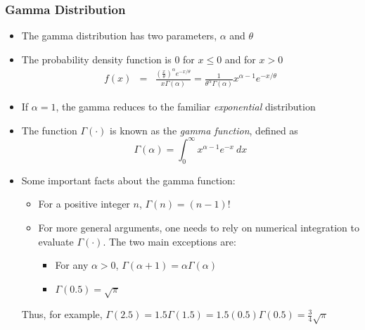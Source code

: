 \documentclass{beamer}
\begin{document}
\begin{frame}%
\frametitle{Gamma Distribution}

\begin{itemize}
\item The gamma distribution has two parameters,  $\alpha$ and $\theta$ %

\item The probability density function is 0 for $x \le 0$ and for $x>0$
\begin{eqnarray*}
f(x) &=& \frac{(\frac{x}{\theta})^{\alpha} e^{-x/\theta}}{x\Gamma(\alpha)} = \frac{1}{\theta^{\alpha} \Gamma(\alpha)} x^{\alpha - 1} e^{-x/\theta}
\end{eqnarray*} %

\item If $\alpha=1$, the gamma reduces to the familiar \textit{exponential} distribution
\item The function $\Gamma(\cdot)$ is known as the \textit{gamma function}, defined as
\begin{equation*}
\Gamma(\alpha) =  \int_0^{\infty} x^{\alpha-1} e^{-x} ~dx
\end{equation*} %
\item Some important facts about the gamma function: %

\begin{itemize}
\item For a positive integer $n$, $\Gamma(n) = (n-1)!$ %

\item For more general arguments, one needs to rely on numerical integration to evaluate $\Gamma(\cdot)$. The two main exceptions are:
\begin{itemize}
\item For any $\alpha>0$, $\Gamma(\alpha+1)=\alpha\Gamma(\alpha)$
\item $\Gamma(0.5)=\sqrt{\pi}$
\end{itemize}\end{itemize}
Thus, for example, $\Gamma(2.5)=1.5 \Gamma(1.5) = 1.5 (0.5)
\Gamma(0.5) = \frac{3}{4} \sqrt{\pi} $
\end{itemize}
\end{frame}
\end{document}
